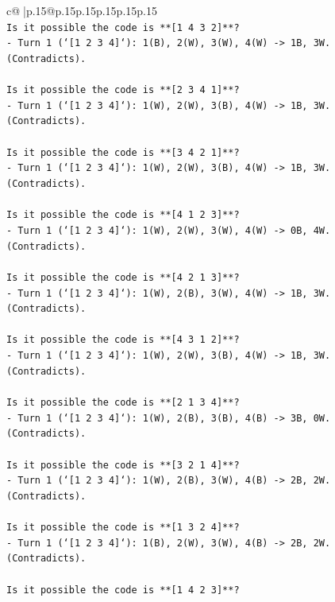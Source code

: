 \documentclass{article}
\begin{document}
{\begin{supertabular}{c@{$\;$}|p{.15\linewidth}@{}p{.15\linewidth}p{.15\linewidth}p{.15\linewidth}p{.15\linewidth}p{.15\linewidth}}
{{{\\ 
\texttt{Is it possible the code is **{[}1 4 3 2{]}**?} \\
\texttt{{-} Turn 1 (`{[}1 2 3 4{]}`): 1(B), 2(W), 3(W), 4(W) {-}> 1B, 3W. (Contradicts).} \\
\\ 
\texttt{Is it possible the code is **{[}2 3 4 1{]}**?} \\
\texttt{{-} Turn 1 (`{[}1 2 3 4{]}`): 1(W), 2(W), 3(B), 4(W) {-}> 1B, 3W. (Contradicts).} \\
\\ 
\texttt{Is it possible the code is **{[}3 4 2 1{]}**?} \\
\texttt{{-} Turn 1 (`{[}1 2 3 4{]}`): 1(W), 2(W), 3(B), 4(W) {-}> 1B, 3W. (Contradicts).} \\
\\ 
\texttt{Is it possible the code is **{[}4 1 2 3{]}**?} \\
\texttt{{-} Turn 1 (`{[}1 2 3 4{]}`): 1(W), 2(W), 3(W), 4(W) {-}> 0B, 4W. (Contradicts).} \\
\\ 
\texttt{Is it possible the code is **{[}4 2 1 3{]}**?} \\
\texttt{{-} Turn 1 (`{[}1 2 3 4{]}`): 1(W), 2(B), 3(W), 4(W) {-}> 1B, 3W. (Contradicts).} \\
\\ 
\texttt{Is it possible the code is **{[}4 3 1 2{]}**?} \\
\texttt{{-} Turn 1 (`{[}1 2 3 4{]}`): 1(W), 2(W), 3(B), 4(W) {-}> 1B, 3W. (Contradicts).} \\
\\ 
\texttt{Is it possible the code is **{[}2 1 3 4{]}**?} \\
\texttt{{-} Turn 1 (`{[}1 2 3 4{]}`): 1(W), 2(B), 3(B), 4(B) {-}> 3B, 0W. (Contradicts).} \\
\\ 
\texttt{Is it possible the code is **{[}3 2 1 4{]}**?} \\
\texttt{{-} Turn 1 (`{[}1 2 3 4{]}`): 1(W), 2(B), 3(W), 4(B) {-}> 2B, 2W. (Contradicts).} \\
\\ 
\texttt{Is it possible the code is **{[}1 3 2 4{]}**?} \\
\texttt{{-} Turn 1 (`{[}1 2 3 4{]}`): 1(B), 2(W), 3(W), 4(B) {-}> 2B, 2W. (Contradicts).} \\
\\ 
\texttt{Is it possible the code is **{[}1 4 2 3{]}**?} \\
}}}
\end{supertabular}}
\end{document}
